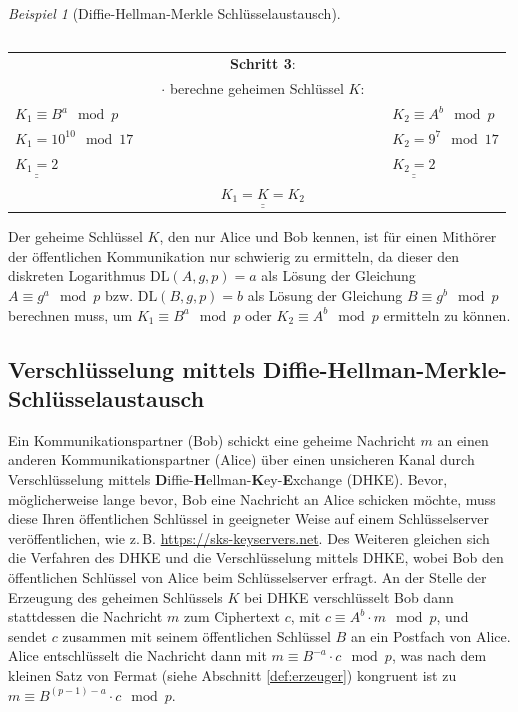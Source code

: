 \documentclass[
  a4paper,
  11pt,
]{scrartcl}
\theoremstyle{plain}
\theoremstyle{definition}
\theoremstyle{remark}
\newtheorem{beispiel}{Beispiel}
\def\doubleunderline#1{\underline{\underline{#1}}} %
\begin{document}
\begin{beispiel}[Diffie-Hellman-Merkle Schlüsselaustausch]
\begin{center}
\begin{tabularx}{\textwidth}{lXcXl}
    \end{tabularx}
    \begin{tabularx}{\textwidth}{lXcXl}
      & & \textbf{Schritt 3}: & & \\
      & & $\cdot$ berechne geheimen Schlüssel $K$: & & \\
      $K_1 \equiv B^a \mod p$ & & & & $K_2 \equiv A^b \mod p$\\
      $K_1 = 10^{10} \mod 17$ & & & & $K_2 = 9^7 \mod 17$\\
      $\doubleunderline{K_1 = 2}$ & & & & $\doubleunderline{K_2 = 2}$\\
      & & $\doubleunderline{K_1 = K = K_2}$ & &
    \end{tabularx}
  \end{center}
  Der geheime Schlüssel $K$, den nur Alice und Bob kennen, ist für einen
  Mithörer der öffentlichen Kommunikation nur schwierig zu ermitteln, da dieser
  den diskreten Logarithmus $\text{DL}(A,g,p) = a$ als Lösung der Gleichung
  $A \equiv g^a \mod p$ bzw. $\text{DL}(B,g,p) = b$ als Lösung der Gleichung
  $B \equiv g^b \mod p$ berechnen muss, um $K_1 \equiv B^a \mod p$ oder
  $K_2 \equiv A^b \mod p$ ermitteln zu können.
\end{beispiel}

\subsection{Verschlüsselung mittels Diffie-Hellman-Merkle-Schlüsselaustausch}
\label{sub:enc_with_dhke}
Ein Kommunikationspartner (Bob) schickt eine geheime Nachricht $m$ an einen
anderen Kommunikationspartner (Alice) über einen unsicheren Kanal durch
Verschlüsselung mittels
\textbf{D}iffie-\textbf{H}ellman-\textbf{K}ey-\textbf{E}xchange (DHKE).
Bevor, möglicherweise lange bevor, Bob eine Nachricht an Alice schicken möchte,
muss diese Ihren öffentlichen Schlüssel in geeigneter Weise auf einem
Schlüsselserver veröffentlichen, wie z.\,B. \url{https://sks-keyservers.net}.
Des Weiteren gleichen sich die Verfahren des DHKE und die Verschlüsselung mittels DHKE, wobei Bob den öffentlichen Schlüssel von Alice beim Schlüsselserver erfragt. An der Stelle der Erzeugung des geheimen Schlüssels $K$ bei DHKE verschlüsselt Bob dann stattdessen die Nachricht $m$ zum Ciphertext $c$, mit $c \equiv A^b \cdot m \mod p$, und sendet $c$ zusammen mit seinem öffentlichen Schlüssel $B$ an ein Postfach von Alice. Alice entschlüsselt die Nachricht dann mit $m \equiv  B^{-a}\cdot c  \mod p$, was nach dem kleinen Satz von Fermat (siehe Abschnitt \ref{def:erzeuger}) kongruent ist zu $m \equiv B^{(p-1)-a}\cdot c \mod p$.
\end{document}
